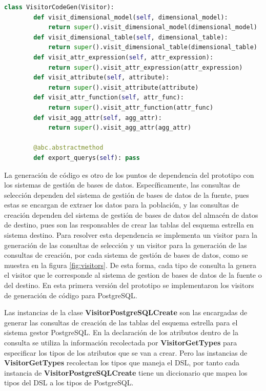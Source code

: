 \begin{lstlisting}[label={code:vcodegen}, caption={Clase VisitorCodeGen}, language={python}]
    class VisitorCodeGen(Visitor):
        def visit_dimensional_model(self, dimensional_model):
            return super().visit_dimensional_model(dimensional_model)
        def visit_dimensional_table(self, dimensional_table):
            return super().visit_dimensional_table(dimensional_table)
        def visit_attr_expression(self, attr_expression):
            return super().visit_attr_expression(attr_expression)
        def visit_attribute(self, attribute):
            return super().visit_attribute(attribute)
        def visit_attr_function(self, attr_func):
            return super().visit_attr_function(attr_func)
        def visit_agg_attr(self, agg_attr):
            return super().visit_agg_attr(agg_attr)

        @abc.abstractmethod
        def export_querys(self): pass
\end{lstlisting}

La generaci\'on de c\'odigo es otro de los puntos de dependencia del prototipo con los sistemas de gesti\'on 
de bases de datos. Específicamente, las consultas de selecci\'on dependen del sistema de gestión de bases 
de datos de la fuente, pues estas se encargan de extraer los datos para la poblaci\'on, y las consultas 
de creaci\'on dependen del sistema de gestión de bases de datos del almac\'en de datos de destino, pues 
son las responsables de crear las tablas del esquema estrella en sistema destino. Para resolver esta dependencia 
se implementa un visitor para la generaci\'on de las consultas de selecci\'on y un visitor para la generaci\'on 
de las consultas de creaci\'on, por cada sistema de gesti\'on de bases de datos, como se muestra en la 
figura \ref{fig:visitors}. De esta forma, cada tipo de consulta la genera el visitor que le corresponde 
al sistema de gestion de bases de datos de la fuente o del destino. En esta primera versi\'on del prototipo 
se implementaron los visitors de generaci\'on de c\'odigo para PostgreSQL.

Las instancias de la clase \textbf{VisitorPostgreSQLCreate} son las encargadas de generar las 
consultas de creaci\'on de las tablas del esquema estrella para el sistema gestor PostgreSQL. En la 
declaraci\'on de los atributos 
dentro de la consulta se utiliza la informaci\'on recolectada por \textbf{VisitorGetTypes} para 
especificar los tipos de los atributos que se van a crear. Pero las instancias de \textbf{VisitorGetTypes} 
recolectan los tipos que maneja el DSL, por tanto cada instancia de \textbf{VisitorPostgreSQLCreate} 
tiene un diccionario que mapea los tipos del DSL a los tipos de PostgreSQL.

